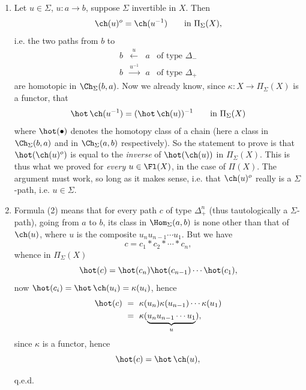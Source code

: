 \begin{enumerate}[label={}]
\item[$1^o$)] Let $u \in \Sigma$, $u : a \longrightarrow b$, suppose $\Sigma$ invertible in $X$. Then
\[
\ch(u)^o = \ch(u^{-1}) \qquad \text{in } \Pi_\Sigma(X),
\]
i.e. the two paths from $b$ to
\[
\begin{array}{cccl}
b & \xleftarrow{\ u\ } & a & \text{of type } \Delta_- \\
b & \xrightarrow{u^{-1}} & a & \text{of type } \Delta_+
\end{array}
\]
are homotopic in $\Ch_\Sigma(b,a)$. Now we already know, since $\kappa : X \longrightarrow \Pi_\Sigma(X)$ is a functor, that
\[
\hot\,\ch(u^{-1}) = (\hot\,\ch(u))^{-1} \qquad \text{in } \Pi_\Sigma(X)
\]
where $\hot(\bullet)$ denotes the homotopy class of a chain (here a class in $\Ch_\Sigma(b,a)$ and in $\Ch_\Sigma(a,b)$ respectively). So the statement to prove is that $\hot(\ch(u)^o)$ is equal to the \textit{inverse} of $\hot(\ch(u))$ in $\Pi_\Sigma(X)$. This is thus what we proved for \textit{every} $u \in \Fl(X)$, in the case of $\Pi(X)$. The argument must work, so long as it makes sense, i.e. that $\ch(u)^o$ really is a $\Sigma$-path, i.e. $u \in \Sigma$.

\item[$2^o$)] Formula (2) means that for every path $c$ of type $\Delta_+^n$ (thus tautologically a  $\Sigma$-path), going from $a$ to $b$, its class in $\Hom_\Sigma(a,b)$ is none other than that of $\ch(u)$, where $u$ is the composite $u_nu_{n-1}\cdots u_1$. But we have
\[
c = c_1 * c_2 * \cdots * c_n,
\]
whence in $\Pi_\Sigma(X)$
\[
\hot(c) = \hot(c_n)\hot(c_{n-1})\cdots\hot(c_1),
\]
now $\hot(c_i) = \hot\,\ch(u_i) = \kappa(u_i)$, hence
\[
\begin{aligned}
\hot(c) \ &= \ \kappa(u_n)\kappa(u_{n-1})\cdots\kappa(u_1) \\
&= \ \kappa(\underbrace{u_nu_{n-1}\cdots u_1}_{u}),
\end{aligned}
\]
since $\kappa$ is a functor, hence
\[
\hot(c) = \hot\,\ch(u),
\]

\hfill q.e.d.
\end{enumerate}

